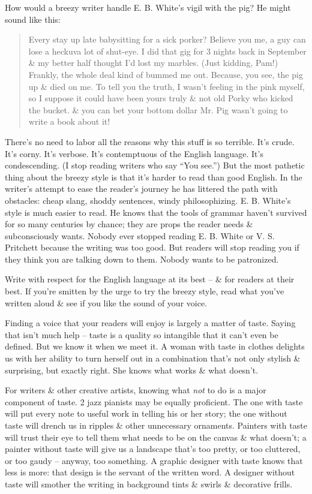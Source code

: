 \documentclass{article}
\numberwithin{equation}{section}
\begin{document}
How would a breezy writer handle E. B. White's vigil with the pig? He might sound like this:
\begin{quotation}
	Every stay up late babysitting for a sick porker? Believe you me, a guy can lose a heckuva lot of shut-eye. I did that gig for 3 nights back in September \& my better half thought I'd lost my marbles. (Just kidding, Pam!) Frankly, the whole deal kind of bummed me out. Because, you see, the pig up \& died on me. To tell you the truth, I wasn't feeling in the pink myself, so I suppose it could have been yours truly \& not old Porky who kicked the bucket. \& you can bet your bottom dollar Mr. Pig wasn't going to write a book about it!
\end{quotation}
There's no need to labor all the reasons why this stuff is so terrible. It's crude. It's corny. It's verbose. It's contemptuous of the English language. It's condescending. (I stop reading writers who say ``You see.'') But the most pathetic thing about the breezy style is that it's harder to read than good English. In the writer's attempt to ease the reader's journey he has littered the path with obstacles: cheap slang, shoddy sentences, windy philosophizing. E. B. White's style is much easier to read. He knows that the tools of grammar haven't survived for so many centuries by chance; they are props the reader needs \& subconsciously wants. Nobody ever stopped reading E. B. White or V. S. Pritchett because the writing was too good. But readers will stop reading you if they think you are talking down to them. Nobody wants to be patronized.

Write with respect for the English language at its best -- \& for readers at their best. If you're smitten by the urge to try the breezy style, read what you've written aloud \& see if you like the sound of your voice.

Finding a voice that your readers will enjoy is largely a matter of taste. Saying that isn't much help -- taste is a quality so intangible that it can't even be defined. But we know it when we meet it. A woman with taste in clothes delights us with her ability to turn herself out in a combination that's not only stylish \& surprising, but exactly right. She knows what works \& what doesn't.

For writers \& other creative artists, knowing what \textit{not} to do is a major component of taste. 2 jazz pianists may be equally proficient. The one with taste will put every note to useful work in telling his or her story; the one without taste will drench us in ripples \& other unnecessary ornaments. Painters with taste will trust their eye to tell them what needs to be on the canvas \& what doesn't; a painter without taste will give us a landscape that's too pretty, or too cluttered, or too gaudy -- anyway, too something. A graphic designer with taste knows that less is more: that design is the servant of the written word. A designer without taste will smother the writing in background tints \& swirls \& decorative frills.
\end{document}

